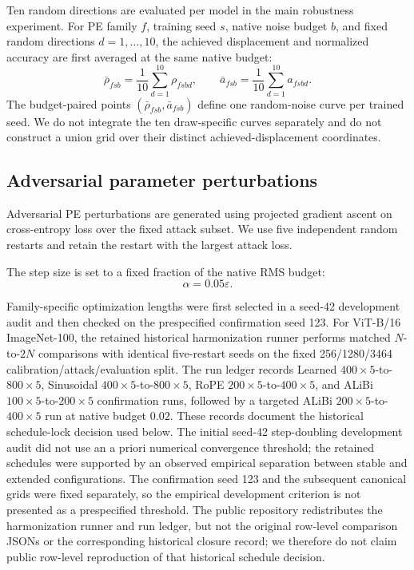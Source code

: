 \documentclass[preprint,12pt,authoryear]{elsarticle}
\begin{document}
Ten random directions are evaluated per model in the main robustness
experiment. For PE family $f$, training seed $s$, native noise budget $b$,
and fixed random directions $d=1,\ldots,10$, the achieved displacement and
normalized accuracy are first averaged at the same native budget:
\begin{equation}
\bar{\rho}_{fsb}
=
\frac{1}{10}\sum_{d=1}^{10}\rho_{fsbd},
\qquad
\bar{a}_{fsb}
=
\frac{1}{10}\sum_{d=1}^{10}a_{fsbd}.
\label{eq:budget-paired-noise}
\end{equation}
The budget-paired points $(\bar{\rho}_{fsb},\bar{a}_{fsb})$ define one
random-noise curve per trained seed. We do not integrate the ten draw-specific
curves separately and do not construct a union grid over their distinct
achieved-displacement coordinates.


\subsection{Adversarial parameter perturbations}

Adversarial PE perturbations are generated using projected gradient ascent
on cross-entropy loss over the fixed attack subset. We use five independent
random restarts and retain the restart with the largest attack loss.

The step size is set to a fixed fraction of the native RMS budget:
\[
\alpha=0.05\varepsilon.
\]

Family-specific optimization lengths were first selected in a seed-42
development audit and then checked on the prespecified confirmation seed 123.
For ViT-B/16 ImageNet-100, the retained historical harmonization runner performs
matched $N$-to-$2N$ comparisons with identical five-restart seeds on the fixed
256/1280/3464 calibration/attack/evaluation split. The run ledger records
Learned $400\times5$-to-$800\times5$, Sinusoidal $400\times5$-to-$800\times5$,
RoPE $200\times5$-to-$400\times5$, and ALiBi $100\times5$-to-$200\times5$
confirmation runs, followed by a targeted ALiBi $200\times5$-to-$400\times5$
run at native budget $0.02$. These records document the historical schedule-lock
decision used below. The initial seed-42 step-doubling development audit did
not use an a priori numerical convergence threshold; the retained schedules
were supported by an observed empirical separation between stable and extended
configurations. The confirmation seed 123 and the subsequent canonical grids
were fixed separately, so the empirical development criterion is not presented
as a prespecified threshold. The public repository redistributes the harmonization
runner and run ledger, but not the original row-level comparison JSONs or the
corresponding historical closure record; we therefore do not claim public row-level
reproduction of that historical schedule decision.
\end{document}
